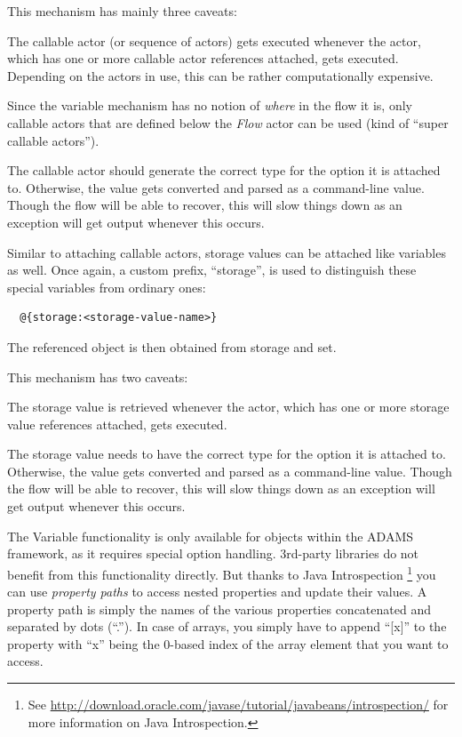This mechanism has mainly three caveats:
\begin{tight_itemize}
	\item The callable actor (or sequence of actors) gets executed whenever the
	actor, which has one or more callable actor references attached, gets executed.
	Depending on the actors in use, this can be rather computationally expensive.
	\item Since the variable mechanism has no notion of \textit{where} in the flow
	it is, only callable actors that are defined below the \textit{Flow} actor can be
	used (kind of ``super callable actors'').
	\item The callable actor should generate the correct type for the option it is
	attached to. Otherwise, the value gets converted and parsed as a command-line
	value. Though the flow will be able to recover, this will slow things down
	as an exception will get output whenever this occurs.
\end{tight_itemize}

Similar to attaching callable actors, storage values can be attached like
variables as well. Once again, a custom prefix, ``storage'', is used to
distinguish these special variables from ordinary ones:
\begin{verbatim}
  @{storage:<storage-value-name>}
\end{verbatim}
The referenced object is then obtained from storage and set.

This mechanism has two caveats:
\begin{tight_itemize}
	\item The storage value is retrieved whenever the actor, which has one or more
	storage value references attached, gets executed.
	\item The storage value needs to have the correct type for the option it is
	attached to. Otherwise, the value gets converted and parsed as a command-line
	value. Though the flow will be able to recover, this will slow things down
	as an exception will get output whenever this occurs.
\end{tight_itemize}

The Variable functionality is only available for objects within the ADAMS
framework, as it requires special option handling. 3rd-party libraries do not
benefit from this functionality directly. But thanks to Java Introspection
\footnote{See
\url{http://download.oracle.com/javase/tutorial/javabeans/introspection/}{} for
more information on Java Introspection.} you can use \textit{property paths} to
access nested properties and update their values. A property path is simply the
names of the various properties concatenated and separated by dots (``.''). In
case of arrays, you simply have to append ``[x]'' to the property with ``x''
being the 0-based index of the array element that you want to access.

